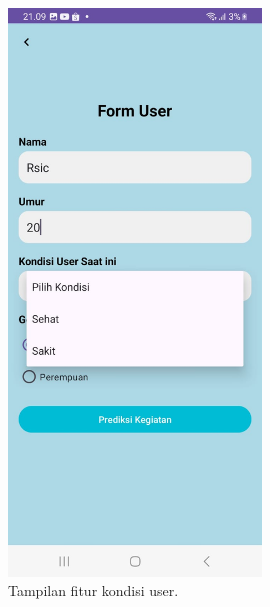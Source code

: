 \documentclass[journal,article,submit,pdftex,moreauthors]{Definitions/mdpi}
\begin{document}
\begin{figure}[H]
    \centering
    \includegraphics[width=0.6\textwidth]{Definitions/images/04.jpeg}
    \caption{Tampilan fitur kondisi user.}
    \label{fig:stats}
\end{figure}
\end{document}
